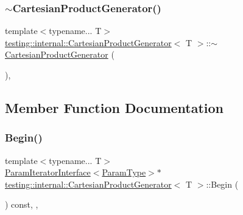 \mbox{\label{classtesting_1_1internal_1_1CartesianProductGenerator_a19fb6a9435f038520cef7643fdf6da71}} 
\subsubsection{\texorpdfstring{$\sim$\+Cartesian\+Product\+Generator()}{~CartesianProductGenerator()}}
{\footnotesize\ttfamily template$<$typename... T$>$ \\
\hyperlink{classtesting_1_1internal_1_1CartesianProductGenerator}{testing\+::internal\+::\+Cartesian\+Product\+Generator}$<$ T $>$\+::$\sim$\hyperlink{classtesting_1_1internal_1_1CartesianProductGenerator}{Cartesian\+Product\+Generator} (\begin{DoxyParamCaption}{ }\end{DoxyParamCaption})\hspace{0.3cm}{\ttfamily [inline]}, {\ttfamily [override]}}



\subsection{Member Function Documentation}
\mbox{\label{classtesting_1_1internal_1_1CartesianProductGenerator_ad2f1bc6289b6dd7e4b5f4fecbfdf2883}} 
\subsubsection{\texorpdfstring{Begin()}{Begin()}}
{\footnotesize\ttfamily template$<$typename... T$>$ \\
\hyperlink{classtesting_1_1internal_1_1ParamIteratorInterface}{Param\+Iterator\+Interface}$<$\hyperlink{classtesting_1_1internal_1_1CartesianProductGenerator_af27131157a9347f0c82420ca081ee7dd}{Param\+Type}$>$$\ast$ \hyperlink{classtesting_1_1internal_1_1CartesianProductGenerator}{testing\+::internal\+::\+Cartesian\+Product\+Generator}$<$ T $>$\+::Begin (\begin{DoxyParamCaption}{ }\end{DoxyParamCaption}) const\hspace{0.3cm}{\ttfamily [inline]}, {\ttfamily [override]}, {\ttfamily [virtual]}}



